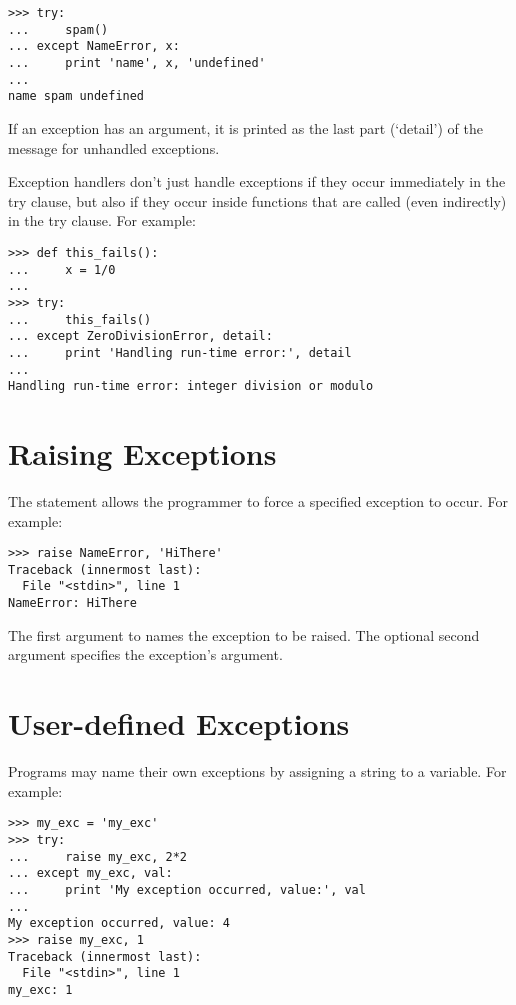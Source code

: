 \documentclass{manual}
\begin{document}
\begin{verbatim}
>>> try:
...     spam()
... except NameError, x:
...     print 'name', x, 'undefined'
... 
name spam undefined
\end{verbatim}

If an exception has an argument, it is printed as the last part
(`detail') of the message for unhandled exceptions.

Exception handlers don't just handle exceptions if they occur
immediately in the try clause, but also if they occur inside functions
that are called (even indirectly) in the try clause.
For example:

\begin{verbatim}
>>> def this_fails():
...     x = 1/0
... 
>>> try:
...     this_fails()
... except ZeroDivisionError, detail:
...     print 'Handling run-time error:', detail
... 
Handling run-time error: integer division or modulo
\end{verbatim}


\section{Raising Exceptions \label{raising}}

The  statement allows the programmer to force a
specified exception to occur.
For example:

\begin{verbatim}
>>> raise NameError, 'HiThere'
Traceback (innermost last):
  File "<stdin>", line 1
NameError: HiThere
\end{verbatim}

The first argument to  names the exception to be
raised.  The optional second argument specifies the exception's
argument.


\section{User-defined Exceptions \label{userExceptions}}

Programs may name their own exceptions by assigning a string to a
variable.
For example:

\begin{verbatim}
>>> my_exc = 'my_exc'
>>> try:
...     raise my_exc, 2*2
... except my_exc, val:
...     print 'My exception occurred, value:', val
... 
My exception occurred, value: 4
>>> raise my_exc, 1
Traceback (innermost last):
  File "<stdin>", line 1
my_exc: 1
\end{verbatim}
\end{document}
